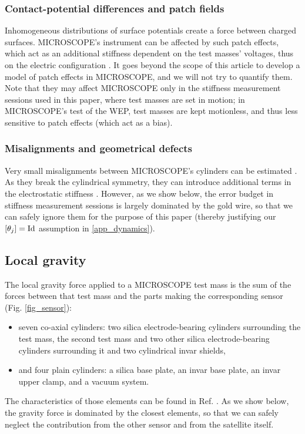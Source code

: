 \documentclass[12pt]{iopart}
\begin{document}
\subsubsection{Contact-potential differences and patch fields} Inhomogeneous distributions of surface potentials create a force between charged surfaces. MICROSCOPE's instrument can be affected by such patch effects, which act as an additional stiffness dependent on the test masses' voltages, thus on the electric configuration \cite{speake96}. It goes beyond the scope of this article to develop a model of patch effects in MICROSCOPE, and we will not try to quantify them. Note that they may affect MICROSCOPE only in the stiffness measurement sessions used in this paper, where test masses are set in motion; in MICROSCOPE's test of the WEP, test masses are kept motionless, and thus less sensitive to patch effects (which act as a bias).

\subsubsection{Misalignments and geometrical defects} Very small misalignments between MICROSCOPE's cylinders can be estimated \cite{hardycqg6}. As they break the cylindrical symmetry, they can introduce additional terms in the electrostatic stiffness \cite{hudson07}. However, as we show below, the error budget in stiffness measurement sessions is largely dominated by the gold wire, so that we can safely ignore them for the purpose of this paper (thereby justifying our $[\theta_j] = {\rm Id}$ assumption in \ref{app_dynamics}).



\subsection{Local gravity} \label{ssect_grav}

The local gravity force applied to a MICROSCOPE test mass is the sum of the forces between that test mass and the parts making the corresponding sensor (Fig. \ref{fig_sensor}): 
\begin{itemize}
\item seven co-axial cylinders: two silica electrode-bearing cylinders surrounding the test mass, the second test mass and two other silica electrode-bearing cylinders surrounding it and two cylindrical invar shields, 
\item and four plain cylinders: a silica base plate, an invar base plate, an invar upper clamp, and a vacuum system.
\end{itemize}
The characteristics of those elements can be found in Ref. \cite{liorzou20}. As we show below, the gravity force is dominated by the closest elements, so that we can safely neglect the contribution from the other sensor and from the satellite itself.
\end{document}
